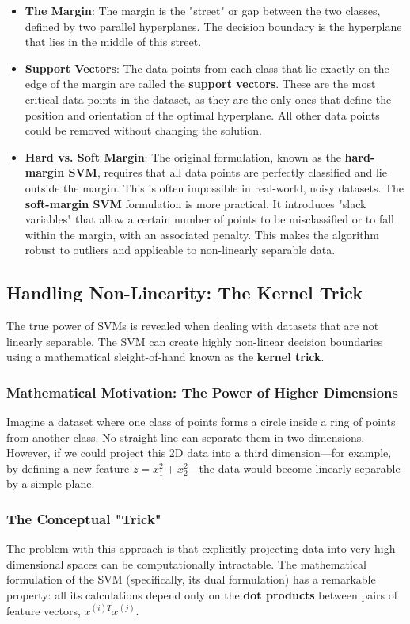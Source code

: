 \begin{itemize}
    \item \textbf{The Margin}: The margin is the "street" or gap between the two classes, defined by two parallel hyperplanes. The decision boundary is the hyperplane that lies in the middle of this street.
    \item \textbf{Support Vectors}: The data points from each class that lie exactly on the edge of the margin are called the \textbf{support vectors}. These are the most critical data points in the dataset, as they are the only ones that define the position and orientation of the optimal hyperplane. All other data points could be removed without changing the solution.
    \item \textbf{Hard vs. Soft Margin}: The original formulation, known as the \textbf{hard-margin SVM}, requires that all data points are perfectly classified and lie outside the margin. This is often impossible in real-world, noisy datasets. The \textbf{soft-margin SVM} formulation is more practical. It introduces "slack variables" that allow a certain number of points to be misclassified or to fall within the margin, with an associated penalty. This makes the algorithm robust to outliers and applicable to non-linearly separable data.
\end{itemize}

\subsection*{Handling Non-Linearity: The Kernel Trick}
The true power of SVMs is revealed when dealing with datasets that are not linearly separable. The SVM can create highly non-linear decision boundaries using a mathematical sleight-of-hand known as the \textbf{kernel trick}.

\subsubsection*{Mathematical Motivation: The Power of Higher Dimensions}
Imagine a dataset where one class of points forms a circle inside a ring of points from another class. No straight line can separate them in two dimensions. However, if we could project this 2D data into a third dimension—for example, by defining a new feature $z = x_1^2 + x_2^2$—the data would become linearly separable by a simple plane.

\subsubsection*{The Conceptual "Trick"}
The problem with this approach is that explicitly projecting data into very high-dimensional spaces can be computationally intractable. The mathematical formulation of the SVM (specifically, its dual formulation) has a remarkable property: all its calculations depend only on the \textbf{dot products} between pairs of feature vectors, $x^{(i)T} x^{(j)}$.

